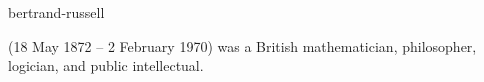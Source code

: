 \documentclass{stex}
\begin{document}
\begin{smodule}{bertrand-russell}
\begin{sparagraph}[style=symdoc]
   (18 May 1872 – 2 February 1970) was a British mathematician, philosopher, logician, and public intellectual.
\end{sparagraph}
\end{smodule}
\end{document}
